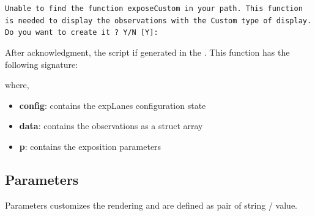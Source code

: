 \documentclass[a4paper,fleqn]{tufte-handout}
\newcommand{\explanes}{\textsf{expLanes} }
\begin{document}
\texttt{Unable to find the function exposeCustom in your path. This function is needed to display the observations with the Custom type of display. \\
Do you want to create it ? Y/N [Y]:}

After acknowledgment, the script if generated in the . This function has the following signature:


where,
\begin{itemize}
\item \textbf{config}: contains the \explanes configuration state                  
\item \textbf{data}: contains the observations as a struct array                  
\item \textbf{p}: contains the exposition parameters   
\end{itemize}

\subsection{Parameters}

Parameters customizes the rendering and are defined as pair of string / value.
\end{document}
